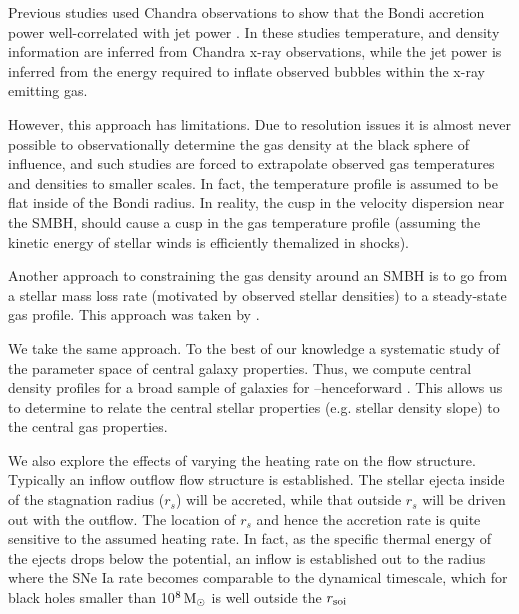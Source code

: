 \documentclass[usenatbib,fleqn]{mn2e}
\newcommand{\rs}{r_s}
\newcommand{\soi}{\rm soi}
\newcommand{\rsoi}{r_{\soi}}
\begin{document}
Previous studies used Chandra observations to show that the Bondi accretion power well-correlated with jet power \citep{AllenDunn+:2006a,Fujita+:2013a}. In these studies temperature, and density information are inferred from Chandra x-ray observations, while the jet power is inferred from the energy required to inflate observed bubbles within the x-ray emitting gas. 

However, this approach has limitations. Due to resolution issues it is almost never possible to observationally determine the gas density at the black sphere of influence, and such studies are forced to extrapolate observed gas temperatures and densities to smaller scales.  In fact, the temperature profile is assumed to be flat inside of the Bondi radius.  In reality, the cusp in the velocity dispersion near the SMBH, should cause a cusp in the gas temperature profile (assuming the kinetic energy of stellar winds is efficiently themalized in shocks). 

Another approach to constraining the gas density around an SMBH is to go from a stellar mass loss rate (motivated by observed stellar densities) to a steady-state gas profile. This approach was taken by \citealt{Quataert:2004a,De-ColleGuillochon+:2012a,ShcherbakovWong+:2014a}. 

We take the same approach. To the best of our knowledge a systematic study of the parameter space of central galaxy properties. Thus, we compute central density profiles for a broad sample of galaxies for \cite{WangMerritt:2004a}--henceforward .  This allows us to determine to relate the central stellar properties (e.g. stellar density slope) to the central gas properties. 

We also explore the effects of varying the heating rate on the flow structure. Typically an inflow outflow flow structure is established. The stellar ejecta inside of the stagnation radius ($\rs$) will be accreted, while that outside $\rs$ will be driven out with the outflow. The location of $\rs$ and hence the accretion rate is  quite sensitive to the assumed heating rate.  In fact, as the specific thermal energy of the ejects drops below the potential, an inflow is established out to the radius where the SNe Ia rate becomes comparable to the dynamical timescale, which for black holes smaller than 10$^8 \,{\rm M_\odot}$ is well outside the $\rsoi$ 
\end{document}

